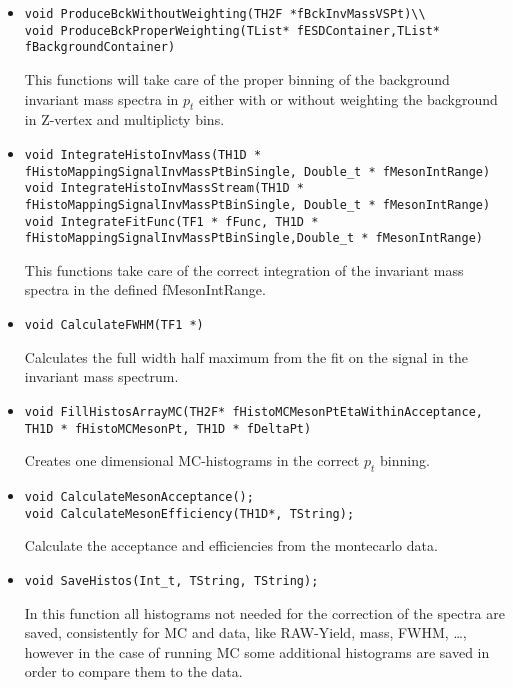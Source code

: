 \begin{itemize}
		\item \begin{lstlisting}
void ProduceBckWithoutWeighting(TH2F *fBckInvMassVSPt)\\
void ProduceBckProperWeighting(TList* fESDContainer,TList* fBackgroundContainer)
		      \end{lstlisting}
			This functions will take care of the proper binning of the background invariant mass spectra in $p_t$ either with or without weighting the background in Z-vertex and multiplicty bins.
		\item \begin{lstlisting}
void IntegrateHistoInvMass(TH1D * fHistoMappingSignalInvMassPtBinSingle, Double_t * fMesonIntRange)
void IntegrateHistoInvMassStream(TH1D * fHistoMappingSignalInvMassPtBinSingle, Double_t * fMesonIntRange)
void IntegrateFitFunc(TF1 * fFunc, TH1D *  fHistoMappingSignalInvMassPtBinSingle,Double_t * fMesonIntRange)
		      \end{lstlisting}
			This functions take care of the correct integration of the invariant mass spectra in the defined fMesonIntRange. 
		\item \begin{lstlisting}
void CalculateFWHM(TF1 *) 
		      \end{lstlisting}
		      Calculates the full width half maximum from the fit on the signal in the invariant mass spectrum.
		\item \begin{lstlisting}
void FillHistosArrayMC(TH2F* fHistoMCMesonPtEtaWithinAcceptance, TH1D * fHistoMCMesonPt, TH1D * fDeltaPt) 
		      \end{lstlisting}
		     Creates one dimensional MC-histograms in the correct $p_t$ binning.
		\item \begin{lstlisting} 
void CalculateMesonAcceptance();
void CalculateMesonEfficiency(TH1D*, TString);
		      \end{lstlisting}
			Calculate the acceptance and efficiencies from the montecarlo data.
		\item \begin{lstlisting}
void SaveHistos(Int_t, TString, TString);
		      \end{lstlisting}
			In this function all histograms not needed for the correction of the spectra are saved, consistently for MC and data, like RAW-Yield, mass, FWHM, \ldots, however in the case of running MC some additional histograms are saved in order to compare them to the data.

\end{itemize}
